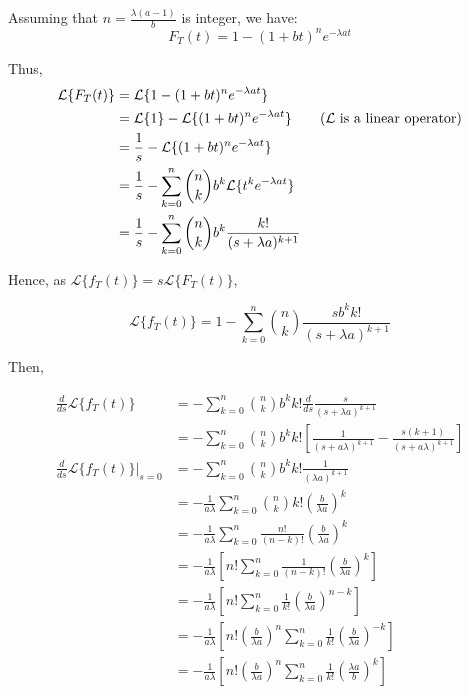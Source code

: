 Assuming that $n = \frac{\lambda(a-1)}{b}$ is integer, we have:
$$F_T(t) = 1 - (1+bt)^n e^{-\lambda at}$$

Thus,
\begin{align*}
\mathcal{L}\{F_T(t)\} &= \mathcal{L}\{1 - (1+bt)^n e^{-\lambda at}\} \\
	&= \mathcal{L}\{1\} - \mathcal{L}\{(1+bt)^n e^{-\lambda at}\} \tag{$\mathcal{L}$ is a linear operator} \\
	&= \frac{1}{s} - \mathcal{L}\{(1+bt)^n e^{-\lambda at}\} \\
	&= \frac{1}{s} - \sum_{k=0}^n \binom{n}{k} b^k \mathcal{L}\{t^k e^{-\lambda at}\} \\
	&= \frac{1}{s} - \sum_{k=0}^n \binom{n}{k} b^k \frac{k!}{(s+\lambda a)^{k+1}}
\end{align*}

Hence, as $\mathcal{L}\{f_T(t)\} = s \mathcal{L}\{F_T(t)\}$,

$$\mathcal{L}\{f_T(t)\} = 1 - \sum_{k=0}^n \binom{n}{k} \frac{s b^k k!}{(s+\lambda a)^{k+1}}$$

Then,

\begin{align*}
\frac{d}{ds} \mathcal{L}\{f_T(t)\} 
	&= - \sum_{k=0}^n \binom{n}{k} b^k k! \frac{d}{ds} \frac{s}{(s+\lambda a)^{k+1}} \\
	&= - \sum_{k=0}^n \binom{n}{k} b^k k! \left[ \frac{1}{(s+a\lambda)^{k+1}} - \frac{s(k+1)}{(s+a \lambda)^{k+1}} \right] \\
\frac{d}{ds} \mathcal{L}\{f_T(t)\}|_{s=0} 
	&= - \sum_{k=0}^n \binom{n}{k} b^k k! \frac{1}{(\lambda a)^{k+1}} \\
	&= - \frac{1}{a\lambda} \sum_{k=0}^n \binom{n}{k} k! \left( \frac{b}{\lambda a} \right)^k \\
	&= - \frac{1}{a\lambda} \sum_{k=0}^n \frac{n!}{(n-k)!} \left( \frac{b}{\lambda a} \right)^k \\
	&= - \frac{1}{a\lambda} \left[ n! \sum_{k=0}^n \frac{1}{(n-k)!} \left( \frac{b}{\lambda a} \right)^k \right] \\
	&= - \frac{1}{a\lambda} \left[ n! \sum_{k=0}^n \frac{1}{k!} \left( \frac{b}{\lambda a} \right)^{n-k} \right] \tag{$k \rightarrow n-k$} \\
	&= - \frac{1}{a\lambda} \left[ n! \left(\frac{b}{\lambda a}\right)^n \sum_{k=0}^n \frac{1}{k!} \left( \frac{b}{\lambda a} \right)^{-k} \right] \\
	&= - \frac{1}{a\lambda} \left[ n! \left(\frac{b}{\lambda a}\right)^n \sum_{k=0}^n \frac{1}{k!} \left( \frac{\lambda a}{b} \right)^{k} \right]
\end{align*}

